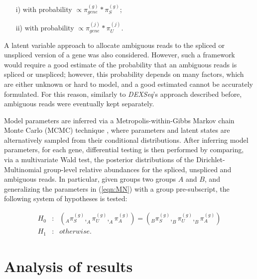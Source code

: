 \begin{itemize}
	\item[i)] with probability $\propto \pi_{gene}^{(g)} *  \pi_S^{(g)}$;
	
	\item[ii)] with probability $\propto \pi_{gene}^{(j)} * \pi_U^{(j)}$.
\end{itemize}

A latent variable approach to allocate ambiguous reads to the spliced or unspliced version of a gene was also considered.
However, such a framework would require a good estimate of the probability that an ambiguous reads is spliced or unspliced; however, this probability depends on many factors, which are either unknown or hard to model, and a good estimated cannot be accurately formulated.
For this reason, similarly to \emph{DEXSeq}'s approach described before, ambiguous reads were eventually kept separately.

Model parameters are inferred via a Metropolis-within-Gibbs Markov chain Monte Carlo (MCMC) technique \citep{MCMC}, where parameters and latent states are alternatively sampled from their conditional distributions. After inferring model parameters, for each gene, differential testing is then performed by comparing, via a multivariate Wald test, the posterior distributions of the Dirichlet-Multinomial group-level relative abundances for the spliced, unspliced and ambiguous reads. In particular, given groups two groups $A$ and $B$, and generalizing the parameters in (\ref{eqn:MN}) with a group pre-subscript, the following system of hypotheses is tested:

\begin{eqnarray}
H_0 &:& \left( _A\pi_S^{(g)}, _A\pi_U^{(g)}, _A\pi_A^{(g)} \right) = \left( _B\pi_S^{(g)}, _B\pi_U^{(g)}, _B\pi_A^{(g)} \right)\\
H_1 &:& otherwise.
\end{eqnarray}

\section{Analysis of results}
